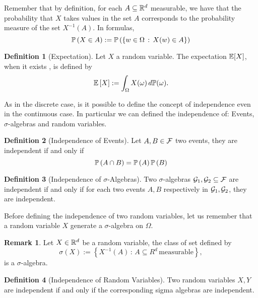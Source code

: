 \documentclass{report}
\theoremstyle{definition}
\newtheorem{defn}{Definition}
\newtheorem{oss}{Remark}
\begin{document}
Remember that by definition, for each $A\subseteq \mathbb{R}^d$ measurable, we have
that the probability that $X$ takes values in the set $A$ corresponds to the
probability measure of the set $X^{-1}(A)$. In formulas, 
\begin{equation}
  \mathbb{P}\left(X\in A\right):=\mathbb{P}\left( \left\{ w\in\Omega\,:\,X(w)\in A \right\}
  \right)
  \label{eq:prob}
\end{equation}


\begin{defn}[Expectation]
  Let $X$ a random variable. The expectation $\mathbb{E}[X]$, when it exists , is
  defined by
  \begin{equation}
    \mathbb{E}\left[ X \right]:=\int_\Omega X(\omega)\, d\mathbb{P}(\omega).
    \label{eq:expectation}
  \end{equation}
\end{defn}

As in the discrete case, is it possible to define the concept of independence
even in the continuous case. In particular we can defined the independence of:
Events, $\sigma$-algebras and random variables.

\begin{defn}[Independence of Events]
  Let $A,B\in\mathcal{F}$ two events, they are independent if and only if
  \begin{equation}
    \mathbb{P}\left( A\cap B \right)=\mathbb{P}\left( A \right) \mathbb{P}\left(B \right)
  \end{equation}
\end{defn}

\begin{defn}[Independence of $\sigma$-Algebras]
  Two $\sigma$-algebras $\mathcal{G}_1, \mathcal{G}_2 \subseteq \mathcal{F}$ are independent if and
  only if for each two events $A,B$ respectively in $\mathcal{G}_1, \mathcal{G}_2$, they are
  independent.
\end{defn}

Before defining the independence of two random variables, let us remember
that a random variable $X$ generate a $\sigma$-algebra on $\Omega$.
\begin{oss}
  Let $X\in\mathbb{R}^d$ be a random variable, the class of set defined by
  \[
    \sigma(X):=\left\{ X^{-1}(A)\,:\, A\subseteq R^d\,\mbox{measurable}
    \right\},
  \]
  is a $\sigma$-algebra.
\end{oss}
\begin{defn}[Independence of Random Variables]
  Two random variables $X,Y$ are independent if and only if the corresponding
  sigma algebras are independent.
\end{defn}
\end{document}
